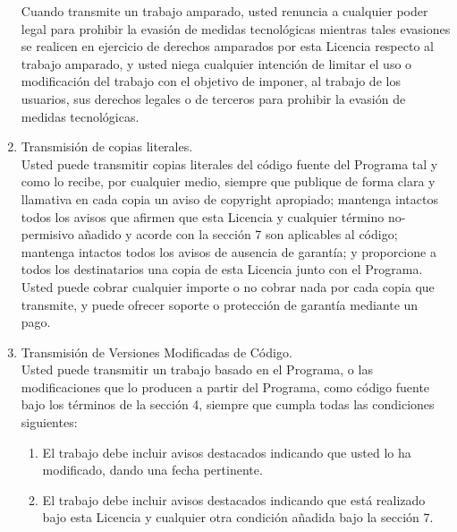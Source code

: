 \begin{enumerate}
	Cuando transmite un trabajo amparado, usted renuncia a cualquier poder legal para prohibir la evasión de medidas tecnológicas mientras tales evasiones se realicen en ejercicio de derechos amparados por esta Licencia respecto al trabajo amparado, y usted niega cualquier intención de limitar el uso o modificación del trabajo con el objetivo de imponer, al trabajo de los usuarios, sus derechos legales o de terceros para prohibir la evasión de medidas tecnológicas.\\
	
	\item Transmisión de copias literales.\\
	
	Usted puede transmitir copias literales del código fuente del Programa tal y como lo recibe, por cualquier medio, siempre que publique de forma clara y llamativa en cada copia un aviso de copyright apropiado; mantenga intactos todos los avisos que afirmen que esta Licencia y cualquier término no-permisivo añadido y acorde con la sección 7 son aplicables al código; mantenga intactos todos los avisos de ausencia de garantía; y proporcione a todos los destinatarios una copia de esta Licencia junto con el Programa.\\
	
	Usted puede cobrar cualquier importe o no cobrar nada por cada copia que transmite, y puede ofrecer soporte o protección de garantía mediante un pago.\\
	
	\item Transmisión de Versiones Modificadas de Código.\\
	
	Usted puede transmitir un trabajo basado en el Programa, o las modificaciones que lo producen a partir del Programa, como código fuente bajo los términos de la sección 4, siempre que cumpla todas las condiciones siguientes:\\
	
	\begin{enumerate}
		
		\item El trabajo debe incluir avisos destacados indicando que usted lo ha modificado, dando una fecha pertinente.\\
		
		\item El trabajo debe incluir avisos destacados indicando que está realizado bajo esta Licencia y cualquier otra condición añadida bajo la sección 7.\\
		

\end{enumerate}
\end{enumerate}
